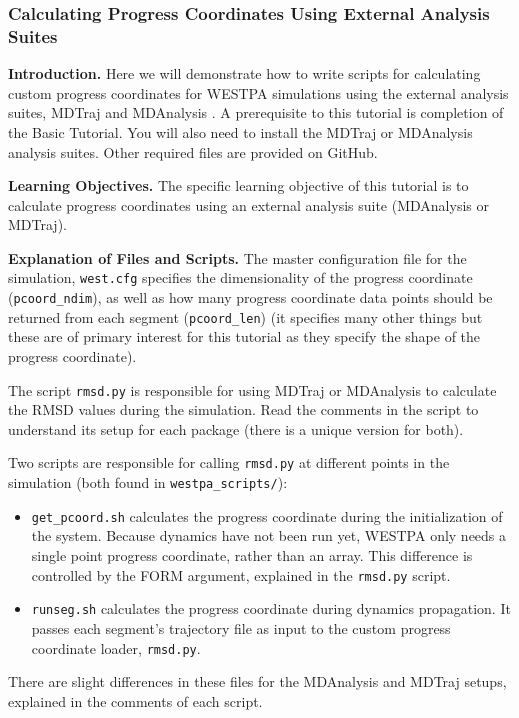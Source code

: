 \documentclass[9pt,tutorial,ASAPversion]{livecoms}
\begin{document}
\subsubsection{Calculating Progress Coordinates Using External Analysis Suites}

\textbf{Introduction.} Here we will demonstrate how to write scripts for calculating custom progress coordinates for WESTPA simulations using the external analysis suites, MDTraj and MDAnalysis \citep{mda2011,mda2016,mdt2015}. 
A prerequisite to this tutorial is completion of the Basic Tutorial. 
You will also need to install the MDTraj or MDAnalysis analysis suites. 
Other required files are provided on GitHub.

\textbf{Learning Objectives.} The specific learning objective of this tutorial is to calculate progress coordinates using an external analysis suite (MDAnalysis or MDTraj). 

\textbf{Explanation of Files and Scripts.} The master configuration file for the simulation, \verb|west.cfg| specifies the dimensionality of the progress coordinate (\verb|pcoord_ndim|), as well as how many progress coordinate data points should be returned from each segment (\verb|pcoord_len|) (it specifies many other things but these are of primary interest for this tutorial as they specify the shape of the progress coordinate).

The script \verb|rmsd.py| is responsible for using MDTraj or MDAnalysis to calculate the RMSD values during the simulation. 
Read the comments in the script to understand its setup for each package (there is a unique version for both).

Two scripts are responsible for calling \verb|rmsd.py| at different points in the simulation (both found in \verb|westpa_scripts/|):
\begin{itemize}
\item \verb|get_pcoord.sh| calculates the progress coordinate during the initialization of the system. 
Because dynamics have not been run yet, WESTPA only needs a single point progress coordinate, rather than an array. 
This difference is controlled by the FORM argument, explained in the \verb|rmsd.py| script.
\item \verb|runseg.sh| calculates the progress coordinate during dynamics propagation. 
It passes each segment's trajectory file as input to the custom progress coordinate loader, \verb|rmsd.py|.
\end{itemize}

There are slight differences in these files for the MDAnalysis and MDTraj setups, explained in the comments of each script.
\end{document}
